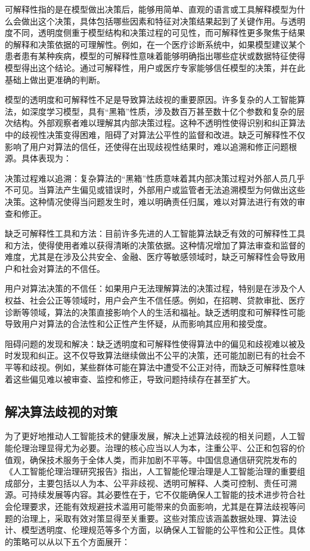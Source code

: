 可解释性指的是在模型做出决策后，能够用简单、直观的语言或工具解释模型为什么会做出这个决策，具体包括哪些因素和特征对决策结果起到了关键作用。与透明度不同，透明度侧重于模型结构和决策过程的可见性，而可解释性更多聚焦于结果的解释和决策依据的可理解性。例如，在一个医疗诊断系统中，如果模型建议某个患者患有某种疾病，模型的可解释性意味着能够明确指出哪些症状或数据特征使得模型得出这个结论。通过可解释性，用户或医疗专家能够信任模型的决策，并在此基础上做出更准确的判断。

模型的透明度和可解释性不足是导致算法歧视的重要原因。许多复杂的人工智能算法，如深度学习模型，具有“黑箱”性质，涉及数百万甚至数十亿个参数和复杂的层次结构。外部观察者难以理解其内部决策过程。这种不透明性使得识别和纠正算法中的歧视性决策变得困难，阻碍了对算法公平性的监督和改进。缺乏可解释性不仅影响了用户对算法的信任，还使得在出现歧视性结果时，难以追溯和修正问题根源。具体表现为：

决策过程难以追溯：复杂算法的“黑箱”性质意味着其内部决策过程对外部人员几乎不可见。当算法产生偏见或错误时，外部用户或监管者无法追溯模型为何做出这些决策。这种情况使得当问题发生时，难以明确责任归属，难以对算法进行有效的审查和修正。

缺乏可解释性工具和方法：目前许多先进的人工智能算法缺乏有效的可解释性工具和方法，使得使用者难以获得清晰的决策依据。这种情况增加了算法审查和监督的难度，尤其是在涉及公共安全、金融、医疗等敏感领域时，缺乏可解释性会导致用户和社会对算法的不信任。

用户对算法决策的不信任：如果用户无法理解算法的决策过程，特别是在涉及个人权益、社会公正等领域时，用户会产生不信任感。例如，在招聘、贷款审批、医疗诊断等领域，算法的决策直接影响个人的生活和福祉。缺乏透明度和可解释性可能导致用户对算法的合法性和公正性产生怀疑，从而影响其应用和接受度。

阻碍问题的发现和解决：缺乏透明度和可解释性使得算法中的偏见和歧视难以被及时发现和纠正。这不仅导致算法继续做出不公平的决策，还可能加剧已有的社会不平等和歧视。例如，某些群体可能在算法中遭受不公正对待，而缺乏可解释性意味着这些偏见难以被审查、监控和修正，导致问题持续存在甚至扩大。


\subsection{解决算法歧视的对策}
为了更好地推动人工智能技术的健康发展，解决上述算法歧视的相关问题，人工智能伦理治理显得尤为必要。治理的核心应当以人为本，注重公平、公正和包容的价值观，确保技术服务于全体人类，而非加剧不平等。中国信息通信研究院发布的《人工智能伦理治理研究报告》指出，人工智能伦理治理是人工智能治理的重要组成部分，主要包括以人为本、公平非歧视、透明可解释、人类可控制、责任可溯源。可持续发展等内容。其必要性在于，它不仅能确保人工智能的技术进步符合社会伦理要求，还能有效规避技术滥用可能带来的负面影响，尤其是在算法歧视等问题的治理上，采取有效对策显得至关重要。这些对策应该涵盖数据处理、算法设计、模型透明度、伦理规范等多个方面，以确保人工智能的公平性和公正性。具体的策略可以从以下五个方面展开：


